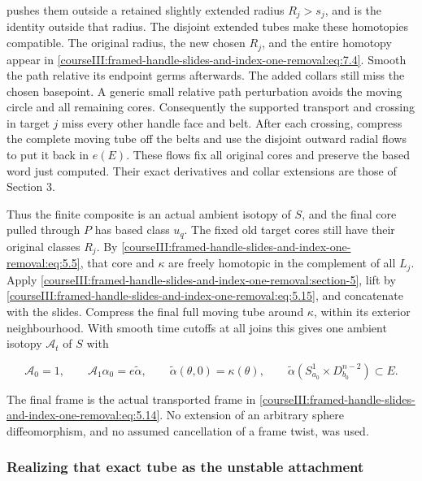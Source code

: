 pushes them outside a retained slightly extended radius \(R_j>s_j\), and is the identity outside that radius. The disjoint extended tubes make these homotopies compatible. The original radius, the new chosen \(R_j\), and the entire homotopy appear in \eqref{courseIII:framed-handle-slides-and-index-one-removal:eq:7.4}. Smooth the path relative its endpoint germs afterwards. The added collars still miss the chosen basepoint. A generic small relative path perturbation avoids the moving circle and all remaining cores. Consequently the supported transport and crossing in target \(j\) miss every other handle face and belt. After each crossing, compress the complete moving tube off the belts and use the disjoint outward radial flows to put it back in \(e(E)\). These flows fix all original cores and preserve the based word just computed. Their exact derivatives and collar extensions are those of Section 3.

Thus the finite composite is an actual ambient isotopy of \(S\), and the final core pulled through \(P\) has based class \(u_q\). The fixed old target cores still have their original classes \(R_j\). By \eqref{courseIII:framed-handle-slides-and-index-one-removal:eq:5.5}, that core and \(\kappa\) are freely homotopic in the complement of all \(L_j\). Apply \cref{courseIII:framed-handle-slides-and-index-one-removal:section-5}, lift by \eqref{courseIII:framed-handle-slides-and-index-one-removal:eq:5.15}, and concatenate with the slides. Compress the final full moving tube around \(\kappa\), within its exterior neighbourhood. With smooth time cutoffs at all joins this gives one ambient isotopy \(\mathcal A_t\) of \(S\) with

\begin{equation}
\mathcal A_0=1,\qquad
 \mathcal A_1\alpha_0=e\widetilde\alpha,\qquad
 \widetilde\alpha(\theta,0)=\kappa(\theta),\qquad
 \widetilde\alpha
   (S^1_{a_0}\times D^{n-2}_{b_0})\subset E.
 \label{courseIII:framed-handle-slides-and-index-one-removal:eq:7.5}
\end{equation}

The final frame is the actual transported frame in \eqref{courseIII:framed-handle-slides-and-index-one-removal:eq:5.14}. No extension of an arbitrary sphere diffeomorphism, and no assumed cancellation of a frame twist, was used.

\subsubsection{Realizing that exact tube as the unstable attachment}
\label{courseIII:framed-handle-slides-and-index-one-removal:section-7.1}

